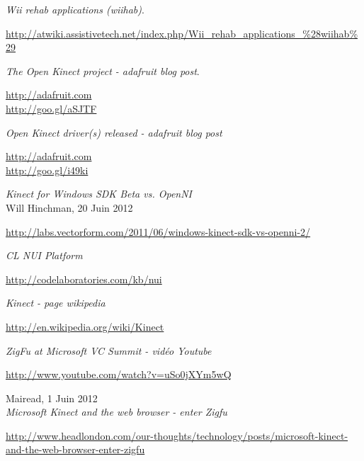         
\begin{thebibliography}{9}

  \emph{Wii rehab applications (wiihab)}.\\
  \begin{small}
  \url{http://atwiki.assistivetech.net/index.php/Wii_rehab_applications_\%28wiihab\%29}
  \end{small}
  
  \emph{The Open Kinect project - adafruit blog post}. \\
  \begin{small}
  \url{http://adafruit.com}\\
  \url{http://goo.gl/aSJTF}
  \end{small}

  \emph{Open Kinect driver(s) released - adafruit blog post}\\
  \begin{small}
  \url{http://adafruit.com}\\
  \url{http://goo.gl/i49ki}
  \end{small}

  \emph{Kinect for Windows SDK Beta vs. OpenNI}\\
  Will Hinchman, 20 Juin 2012\\
  \begin{small}
  \url{http://labs.vectorform.com/2011/06/windows-kinect-sdk-vs-openni-2/}
  \end{small}
  
  \emph{CL NUI Platform}\\
  \begin{small}
  \url{http://codelaboratories.com/kb/nui}
  \end{small}
  
  \emph{Kinect - page wikipedia}\\
  \begin{small}
  \url{http://en.wikipedia.org/wiki/Kinect}
  \end{small}
  
  \emph{ZigFu at Microsoft VC Summit - vidéo Youtube}\\
  \begin{small}
  \url{http://www.youtube.com/watch?v=uSo0jXYm5wQ}
  \end{small}
  
  Mairead, 1 Juin 2012\\
  \emph{Microsoft Kinect and the web browser - enter Zigfu}\\
  \begin{small}
  \url{http://www.headlondon.com/our-thoughts/technology/posts/microsoft-kinect-and-the-web-browser-enter-zigfu}
  \end{small}
  

\end{thebibliography}
